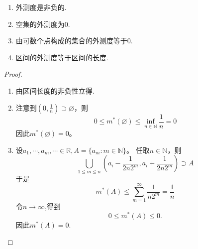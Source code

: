 \documentclass[lang=cn,newtx,10pt,scheme=chinese]{../Template/elegantbook}
\begin{document}
\begin{proposition}[常见集合的Lebesgue外测度]\label{proposition:常见集合的Lebesgue外测度}
\begin{enumerate}[(1)]
  \item 外测度是非负的.

  \item 空集的外测度为0.

  \item 由可数个点构成的集合的外测度等于0.

  \item 区间的外测度等于区间的长度.
\end{enumerate}
\end{proposition}
\begin{proof}
\begin{enumerate}[(1)]
  \item 由区间长度的非负性立得.

  \item 注意到\((0,\frac{1}{n})\supset\varnothing\)，则
  \[
  0\leqslant  m^*(\varnothing)\leqslant \inf_{n\in\mathbb{N}}\frac{1}{n}=0
  \]
  因此\(m^*(\varnothing)=0\)。

  \item 设\(a_1,\cdots,a_m,\cdots\in\mathbb{R},A = \{a_m:m\in\mathbb{N}\}\)。
  任取\(n\in\mathbb{N}\)，则
  \[
  \bigcup_{1\leqslant  m\leqslant  n}\left(a_i - \frac{1}{2n2^m},a_i + \frac{1}{2n2^m}\right)\supset A
  \]
  于是
  \[
  m^*(A)\leqslant \sum_{m = 1}^{\infty}\frac{1}{n2^m}=\frac{1}{n}
  \]
  令\(n\rightarrow\infty\),得到
  \[
  0\leqslant  m^*(A)\leqslant 0.
  \]
  因此\(m^*(A)=0\).


\end{enumerate}
\end{proof}
\end{document}
